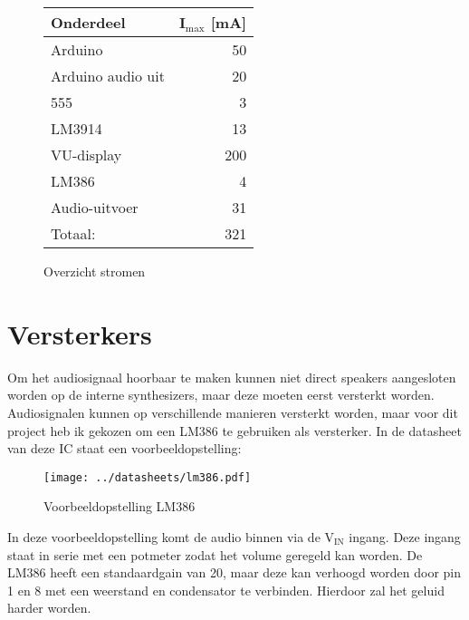 \documentclass[12pt, a4paper, dutch]{article}
\newcommand{\sub}[1]{$_{\text{#1}}$}
\begin{document}
\begin{figure}[H]
\centering
\begin{tabular}{lr}
\toprule
Onderdeel & I\sub{max} [\si{\milli\ampere}]\\
\midrule
Arduino & \num{50} \\
Arduino audio uit & \num{20} \\
555 & \num{3} \\
LM3914 & \num{13} \\
VU-display & \num{200} \\
LM386 & \num{4} \\
Audio-uitvoer & \num{31} \\
\midrule
\hfill Totaal: & \num{321} \\
\bottomrule
\end{tabular}
\caption{Overzicht stromen}
\end{figure}

\section{Versterkers}


Om het audiosignaal hoorbaar te maken kunnen niet direct speakers aangesloten worden
op de interne synthesizers, maar deze moeten eerst versterkt worden. Audiosignalen
kunnen op verschillende manieren versterkt worden, maar voor dit project heb ik
gekozen om een LM386 te gebruiken als versterker. In de datasheet van deze IC staat
een voorbeeldopstelling:

\begin{figure}[H]
\centering
\texttt{[image: ../datasheets/lm386.pdf]}
\caption{Voorbeeldopstelling LM386}
\end{figure}

In deze voorbeeldopstelling komt de audio binnen via de V\sub{IN} ingang. Deze ingang
staat in serie met een potmeter zodat het volume geregeld kan worden. De LM386 heeft
een standaardgain van 20, maar deze kan verhoogd worden door pin 1 en 8 met een
weerstand en condensator te verbinden. Hierdoor zal het geluid harder worden.
\end{document}
